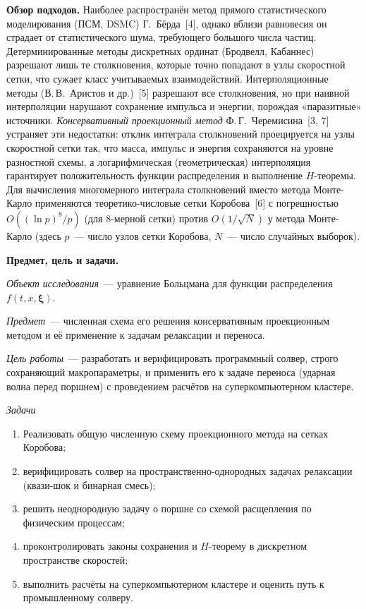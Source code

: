 \documentclass[14pt,a4paper]{extreport}
\numberwithin{equation}{chapter}
\numberwithin{figure}{chapter}
\numberwithin{table}{chapter}
\newcommand{\xv}{\boldsymbol{\xi}}
\begin{document}
\textbf{Обзор подходов.}
Наиболее распространён метод прямого статистического моделирования (ПСМ, DSMC) Г.~Бёрда~[4], однако вблизи
равновесия он страдает от статистического шума, требующего большого числа частиц.
Детерминированные методы дискретных ординат (Бродвелл, Кабаннес) разрешают лишь те столкновения, которые точно попадают
в узлы скоростной сетки, что сужает класс учитываемых взаимодействий.
Интерполяционные методы (В.\,В.~Аристов и др.)~[5] разрешают все столкновения, но при наивной интерполяции
нарушают сохранение импульса и энергии, порождая «паразитные» источники.
\emph{Консервативный проекционный метод} Ф.\,Г.~Черемисина~[3, 7] устраняет эти недостатки: отклик
интеграла столкновений проецируется на узлы скоростной сетки так, что масса, импульс и энергия сохраняются на уровне
разностной схемы, а логарифмическая (геометрическая) интерполяция гарантирует положительность функции распределения и
выполнение $H$-теоремы.
Для вычисления многомерного интеграла столкновений вместо метода Монте-Карло применяются теоретико-числовые сетки
Коробова~[6] с погрешностью $O\!\left((\ln p)^{8}/p\right)$ (для 8-мерной сетки) против
$O\!\left(1/\sqrt{N}\right)$ у метода Монте-Карло (здесь $p$~--- число узлов сетки Коробова, $N$~--- число случайных
выборок).

\textbf{Предмет, цель и задачи.}

\emph{Объект исследования}~--- уравнение Больцмана для функции распределения $f(t,x,\xv)$.

\emph{Предмет}~--- численная схема его решения консервативным проекционным методом и её применение к задачам релаксации
и переноса.

\emph{Цель работы}~--- разработать и верифицировать программный солвер, строго сохраняющий макропараметры, и применить
его к задаче переноса (ударная волна перед поршнем) с проведением расчётов на суперкомпьютерном кластере.

\emph{Задачи}
\begin{enumerate}
  \item Реализовать общую численную схему проекционного метода на сетках Коробова;
  \item верифицировать солвер на пространственно-однородных задачах релаксации (квази-шок и бинарная смесь);
  \item решить неоднородную задачу о поршне со схемой расщепления по физическим процессам;
  \item проконтролировать законы сохранения и $H$-теорему в дискретном пространстве скоростей;
  \item выполнить расчёты на суперкомпьютерном кластере и оценить путь к промышленному солверу.
\end{enumerate}
\end{document}
